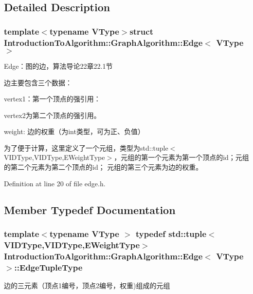 \subsection{Detailed Description}
\subsubsection*{template$<$typename V\+Type$>$struct Introduction\+To\+Algorithm\+::\+Graph\+Algorithm\+::\+Edge$<$ V\+Type $>$}

Edge：图的边，算法导论22章22.1节 

边主要包含三个数据：


\begin{DoxyItemize}
\item {\ttfamily vertex1}：第一个顶点的强引用：
\item {\ttfamily vertex2}为第二个顶点的强引用。
\item {\ttfamily weight}\+: 边的权重（为int类型，可为正、负值）
\end{DoxyItemize}

为了便于计算，这里定义了一个元组，类型为{\ttfamily std\+::tuple$<$V\+I\+D\+Type,V\+I\+D\+Type,E\+Weight\+Type$>$}，元组的第一个元素为第一个顶点的{\ttfamily id}；元组的第二个元素为第二个顶点的{\ttfamily id}； 元组的第三个元素为边的权重。 

Definition at line 20 of file edge.\+h.



\subsection{Member Typedef Documentation}
\hypertarget{struct_introduction_to_algorithm_1_1_graph_algorithm_1_1_edge_a6cc12c05f7645ce74a6cff13b9ea932c}{}
\subsubsection[{Edge\+Tuple\+Type}]{\setlength{\rightskip}{0pt plus 5cm}template$<$typename V\+Type $>$ typedef std\+::tuple$<${\bf V\+I\+D\+Type},{\bf V\+I\+D\+Type},{\bf E\+Weight\+Type}$>$ {\bf Introduction\+To\+Algorithm\+::\+Graph\+Algorithm\+::\+Edge}$<$ V\+Type $>$\+::{\bf Edge\+Tuple\+Type}}\label{struct_introduction_to_algorithm_1_1_graph_algorithm_1_1_edge_a6cc12c05f7645ce74a6cff13b9ea932c}
边的三元素（顶点1编号，顶点2编号，权重)组成的元组 


